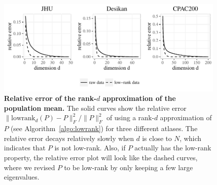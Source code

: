 \documentclass[10pt,letterpaper]{article}
\begin{document}
\begin{figure}[!htbp]
\centering
\includegraphics[width=.6\textheight]{screeplot_ratio_all.pdf} 
\caption{{\bf Relative error of the rank-$d$ approximation of the population mean.}
The solid curves show the relative error $\|\mathrm{lowrank}_d(P)-P\|_F^2/\|P\|_F^2$ of using a rank-$d$ approximation of $P$ (see Algorithm~\ref{algo:lowrank}) for three different atlases.
The relative error decays relatively slowly when $d$ is close to $N$, which indicates that $P$ is not low-rank.
Also, if $P$ actually has the low-rank property, the relative error plot will look like the dashed curves, where we revised $P$ to be low-rank by only keeping a few large eigenvalues. }
\label{fig:screeplot}
\end{figure}


\end{document}
